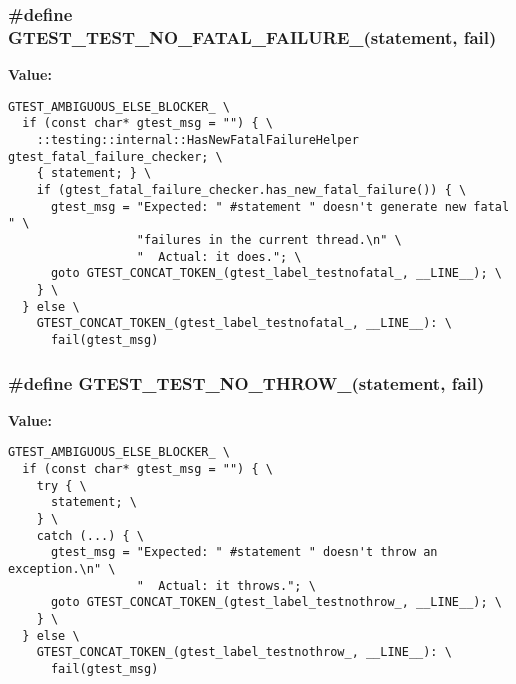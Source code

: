 \subsubsection{\setlength{\rightskip}{0pt plus 5cm}\#define GTEST\_\-TEST\_\-NO\_\-FATAL\_\-FAILURE\_\-(statement, fail)}\label{gtest-internal_8h_1e9beba69154c63eeeb9cb0d0d7904ab}


\textbf{Value:}

\begin{Code}\begin{verbatim}GTEST_AMBIGUOUS_ELSE_BLOCKER_ \
  if (const char* gtest_msg = "") { \
    ::testing::internal::HasNewFatalFailureHelper gtest_fatal_failure_checker; \
    { statement; } \
    if (gtest_fatal_failure_checker.has_new_fatal_failure()) { \
      gtest_msg = "Expected: " #statement " doesn't generate new fatal " \
                  "failures in the current thread.\n" \
                  "  Actual: it does."; \
      goto GTEST_CONCAT_TOKEN_(gtest_label_testnofatal_, __LINE__); \
    } \
  } else \
    GTEST_CONCAT_TOKEN_(gtest_label_testnofatal_, __LINE__): \
      fail(gtest_msg)
\end{verbatim}
\end{Code}
\subsubsection{\setlength{\rightskip}{0pt plus 5cm}\#define GTEST\_\-TEST\_\-NO\_\-THROW\_\-(statement, fail)}\label{gtest-internal_8h_f532432189eeefbc5f0228a7eda6a3a4}


\textbf{Value:}

\begin{Code}\begin{verbatim}GTEST_AMBIGUOUS_ELSE_BLOCKER_ \
  if (const char* gtest_msg = "") { \
    try { \
      statement; \
    } \
    catch (...) { \
      gtest_msg = "Expected: " #statement " doesn't throw an exception.\n" \
                  "  Actual: it throws."; \
      goto GTEST_CONCAT_TOKEN_(gtest_label_testnothrow_, __LINE__); \
    } \
  } else \
    GTEST_CONCAT_TOKEN_(gtest_label_testnothrow_, __LINE__): \
      fail(gtest_msg)
\end{verbatim}
\end{Code}
